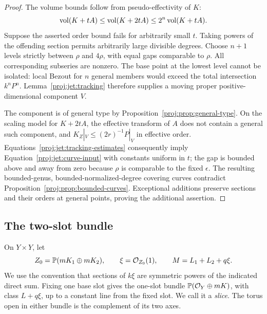 \begin{proof}
The volume bounds follow from pseudo-effectivity of \(K\):
\[
 \operatorname{vol}(K+tA)\le\operatorname{vol}(K+2tA)\le2^n\operatorname{vol}(K+tA).
\]
Suppose the asserted order bound fails for arbitrarily small \(t\).
Taking powers of the offending section permits arbitrarily large
divisible degrees.  Choose \(n+1\) levels strictly between \(\rho\)
and \(4\rho\), with equal gaps comparable to \(\rho\).
All corresponding subseries are nonzero.  The base point at the
lowest level cannot be isolated: local Bezout for \(n\) general
members would exceed the total intersection \(k^nP^n\).
Lemma~\ref{proj:jet:tracking} therefore supplies a moving proper
positive-dimensional component \(V\).

The component is of general type by
Proposition~\ref{proj:prop:general-type}.  On the scaling model for
\(K+2tA\), the effective transform of \(A\) does not contain a
general such component, and
\(K_Z|_V\le(2r)^{-1}P|_V\) in effective order.
Equations~\eqref{proj:jet:tracking-estimates} consequently imply
Equation~\eqref{proj:jet:curve-input} with constants uniform in \(t\);
the gap is bounded above and away from zero because
\(\rho\) is comparable to the fixed \(\epsilon\).
The resulting bounded-genus, bounded-normalized-degree covering
curves contradict Proposition~\ref{proj:prop:bounded-curves}.
Exceptional additions preserve sections and their orders at
general points, proving the additional assertion.
\end{proof}

\subsection{The two-slot bundle}

On \(Y\times Y\), let
\begin{equation}\label{proj:jet:two-slot}
 Z_0=\mathbb{P}(mK_1\oplus mK_2),\qquad
 \xi=\mathcal{O}_{Z_0}(1),\qquad M=L_1+L_2+q\xi.
\end{equation}
We use the convention that sections of \(k\xi\) are symmetric powers
of the indicated direct sum.  Fixing one base slot gives the
one-slot bundle
\(\mathbb{P}(\mathcal{O}_Y\oplus mK)\), with class \(L+q\xi\), up to a constant
line from the fixed slot.  We call it a \emph{slice}.
The torus open in either bundle is the complement of its two axes.

